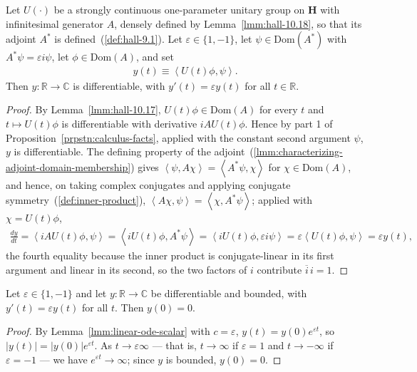\begin{lemma}
    \label{lmm:orbit-inner-ode}
    \leanok
    Let $U(\cdot)$ be a strongly continuous one-parameter unitary group on $\mathbf{H}$ with infinitesimal generator $A$, densely defined by Lemma~\ref{lmm:hall-10.18}, so that its adjoint $A^*$ is defined~(\ref{def:hall-9.1}). Let $\varepsilon \in \{1, -1\}$, let $\psi \in \text{Dom}(A^*)$ with $A^*\psi = \varepsilon i\psi$, let $\phi \in \text{Dom}(A)$, and set
    \begin{align}
        y(t) \equiv \left< U(t)\phi, \psi \right>.
    \end{align}
    Then $y : \mathbb{R} \rightarrow \mathbb{C}$ is differentiable, with $y'(t) = \varepsilon y(t)$ for all $t \in \mathbb{R}$.
\end{lemma}
\begin{proof}
    \leanok
By Lemma~\ref{lmm:hall-10.17}, $U(t)\phi \in \text{Dom}(A)$ for every $t$ and $t \mapsto U(t)\phi$ is differentiable with derivative $iAU(t)\phi$. Hence by part 1 of Proposition~\ref{prpstn:calculus-facts}, applied with the constant second argument $\psi$, $y$ is differentiable. The defining property of the adjoint~(\ref{lmm:characterizing-adjoint-domain-membership}) gives $\left< \psi, A\chi \right> = \left< A^*\psi, \chi \right>$ for $\chi \in \text{Dom}(A)$, and hence, on taking complex conjugates and applying conjugate symmetry~(\ref{def:inner-product}), $\left< A\chi, \psi \right> = \left< \chi, A^*\psi \right>$; applied with $\chi = U(t)\phi$,
\begin{align}
    \frac{dy}{dt} = \left< iAU(t)\phi, \psi \right> = \left< iU(t)\phi, A^*\psi \right> = \left< iU(t)\phi, \varepsilon i\psi \right> = \varepsilon\left< U(t)\phi, \psi \right> = \varepsilon y(t),
\end{align}
the fourth equality because the inner product is conjugate-linear in its first argument and linear in its second, so the two factors of $i$ contribute $\overline{i}\,i = 1$.
\end{proof}

\begin{lemma}[Bounded Solutions of $y' = \pm y$ Vanish]
    \label{lmm:bounded-exp-solution-zero}
    \leanok
    Let $\varepsilon \in \{1, -1\}$ and let $y : \mathbb{R} \rightarrow \mathbb{C}$ be differentiable and bounded, with $y'(t) = \varepsilon y(t)$ for all $t$. Then $y(0) = 0$.
\end{lemma}
\begin{proof}
    \leanok
By Lemma~\ref{lmm:linear-ode-scalar} with $c = \varepsilon$, $y(t) = y(0)e^{\varepsilon t}$, so $\lvert y(t) \rvert = \lvert y(0) \rvert e^{\varepsilon t}$. As $t \to \varepsilon\infty$ — that is, $t \to \infty$ if $\varepsilon = 1$ and $t \to -\infty$ if $\varepsilon = -1$ — we have $e^{\varepsilon t} \to \infty$; since $y$ is bounded, $y(0) = 0$.
\end{proof}

